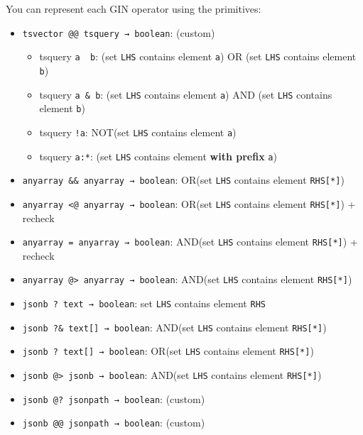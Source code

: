 \documentclass[11pt]{article}
\providecommand{\tightlist}{%
  \setlength{\itemsep}{0pt}\setlength{\parskip}{0pt}}
\begin{document}
You can represent each GIN operator using the primitives:

\begin{itemize}
\tightlist
\item
  \texttt{tsvector\ @@\ tsquery\ →\ boolean}: (custom)

  \begin{itemize}
  \tightlist
  \item
    tsquery \texttt{a\ \textbar{}\ b}: (set \texttt{LHS} contains
    element \texttt{a}) OR (set \texttt{LHS} contains element
    \texttt{b})
  \item
    tsquery \texttt{a\ \&\ b}: (set \texttt{LHS} contains element
    \texttt{a}) AND (set \texttt{LHS} contains element \texttt{b})
  \item
    tsquery \texttt{!a}: NOT(set \texttt{LHS} contains element
    \texttt{a})
  \item
    tsquery \texttt{a:*\textquotesingle{}}: (set \texttt{LHS} contains
    element \textbf{with prefix} \texttt{a})
  \end{itemize}
\item
  \texttt{anyarray\ \&\&\ anyarray\ →\ boolean}: OR(set \texttt{LHS}
  contains element \texttt{RHS{[}*{]}})
\item
  \texttt{anyarray\ \textless{}@\ anyarray\ →\ boolean}: OR(set
  \texttt{LHS} contains element \texttt{RHS{[}*{]}}) + recheck
\item
  \texttt{anyarray\ =\ anyarray\ →\ boolean}: AND(set \texttt{LHS}
  contains element \texttt{RHS{[}*{]}}) + recheck
\item
  \texttt{anyarray\ @\textgreater{}\ anyarray\ →\ boolean}: AND(set
  \texttt{LHS} contains element \texttt{RHS{[}*{]}})
\item
  \texttt{jsonb\ ?\ text\ →\ boolean}: set \texttt{LHS} contains element
  \texttt{RHS}
\item
  \texttt{jsonb\ ?\&\ text{[}{]}\ →\ boolean}: AND(set \texttt{LHS}
  contains element \texttt{RHS{[}*{]}})
\item
  \texttt{jsonb\ ?\textbar{}\ text{[}{]}\ →\ boolean}: OR(set
  \texttt{LHS} contains element \texttt{RHS{[}*{]}})
\item
  \texttt{jsonb\ @\textgreater{}\ jsonb\ →\ boolean}: AND(set
  \texttt{LHS} contains element \texttt{RHS{[}*{]}})
\item
  \texttt{jsonb\ @?\ jsonpath\ →\ boolean}: (custom)
\item
  \texttt{jsonb\ @@\ jsonpath\ →\ boolean}: (custom)


\end{itemize}
\end{document}

